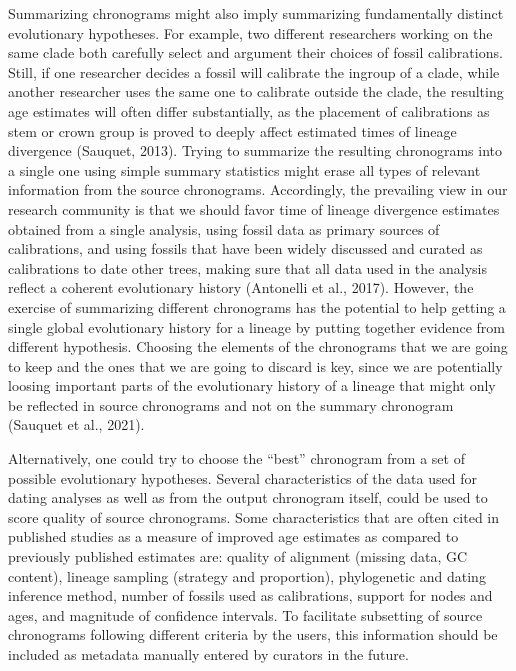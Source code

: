 \documentclass[
  english,
  man]{apa6}
\begin{document}
Summarizing chronograms might also imply summarizing fundamentally distinct evolutionary hypotheses. For example, two different researchers working on the same clade both carefully select and argument their choices of fossil calibrations. Still, if one researcher decides a fossil will calibrate the ingroup of a clade, while another researcher uses the same one to calibrate outside the clade, the resulting age estimates will often differ substantially, as the placement of calibrations as stem or crown group is proved to deeply affect estimated times of lineage divergence (Sauquet, 2013). Trying to summarize the resulting chronograms into a single one using simple summary statistics might erase all types of relevant information from the source chronograms. Accordingly, the prevailing view in our research community is that we should favor time of lineage divergence estimates obtained from a single analysis, using fossil data as primary sources of calibrations, and using fossils that have been widely discussed and curated as calibrations to date other trees, making sure that all data used in the analysis reflect a coherent evolutionary history (Antonelli et al., 2017).
However, the exercise of summarizing different chronograms has the potential to help getting a single global evolutionary history for a lineage by putting together evidence from different hypothesis. Choosing the elements of the chronograms that we are going to keep and the ones that we are going to discard is key, since we are potentially loosing important parts of the evolutionary history of a lineage that might only be reflected in source chronograms and not on the summary chronogram (Sauquet et al., 2021).

Alternatively, one could try to choose the ``best'' chronogram from a set of possible evolutionary hypotheses. Several characteristics of the data used for dating analyses as well as from the output chronogram itself, could be used to score quality of source chronograms. Some characteristics that are often cited in published studies as a measure of improved age estimates as compared to previously published estimates are: quality of alignment (missing data, GC content), lineage sampling (strategy and proportion), phylogenetic and dating inference method, number of fossils used as calibrations, support for nodes and ages, and magnitude of confidence intervals. To facilitate subsetting of source chronograms following different criteria by the users, this information should be included as metadata manually entered by curators in the future.
\end{document}
